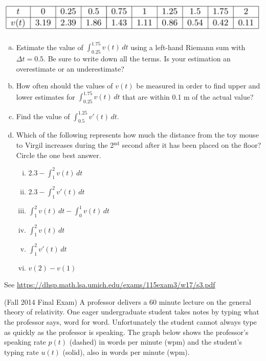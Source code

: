 \documentclass[11pt]{exam}
\begin{document}
\begin{questions}
        \begin{center}
          \includegraphics[scale=0.5]{Figures/table}
        \end{center}
\vspace{-1em}
\begin{enumerate}[(a)]
	\item Estimate the value of $\displaystyle\int_{0.25}^{1.75} v(t) \, dt$ using a left-hand Riemann sum with $\Delta t = 0.5$. Be sure to write down all the terms. Is your estimation an overestimate or an underestimate?
	\item  How often should the values of $v(t)$ be measured in order to find upper and lower estimates for  $\displaystyle\int_{0.25}^{1.75} v(t) \, dt$ that are within 0.1 m of the actual value?
	\item Find the value of $\displaystyle\int_{0.5}^{1.25} v'(t) \, dt$.
	\item Which of the following represents how much the distance from the toy mouse to Virgil increases during the 2$^{\textrm{nd}}$ second after it has been placed on the floor? Circle the one best answer.
	\begin{multicols}{3}
	\begin{enumerate}[(i)]
		\item $2.3 - \displaystyle\int_1^2 v(t) \, dt$
		\item $2.3 - \displaystyle\int_1^2 v'(t) \, dt$
		\item $\displaystyle\int_1^2 v(t) \, dt - \displaystyle\int_0^1 v(t) \, dt$
		\item $\displaystyle\int_1^2 v(t) \, dt$
		\item $\displaystyle\int_1^2 v'(t) \, dt$
		\item $v(2) - v(1)$
	\end{enumerate}
	\end{multicols}
\end{enumerate}
\begin{solution}
  See \href{https://dhsp.math.lsa.umich.edu/exams/115exam3/w17/s3.pdf}{https://dhsp.math.lsa.umich.edu/exams/115exam3/w17/s3.pdf}
\end{solution}
\question (Fall 2014 Final Exam)
A professor delivers a $60$ minute lecture on the general theory of relativity. One eager undergraduate student takes notes by typing what the professor says, word for word. Unfortunately the student cannot always type as quickly as the professor is speaking. The graph below shows the professor's speaking rate $p(t)$ (dashed) in words per minute (wpm) and the student's typing rate $u(t)$ (solid), also in words per minute (wpm).


\end{questions}
\end{document}
